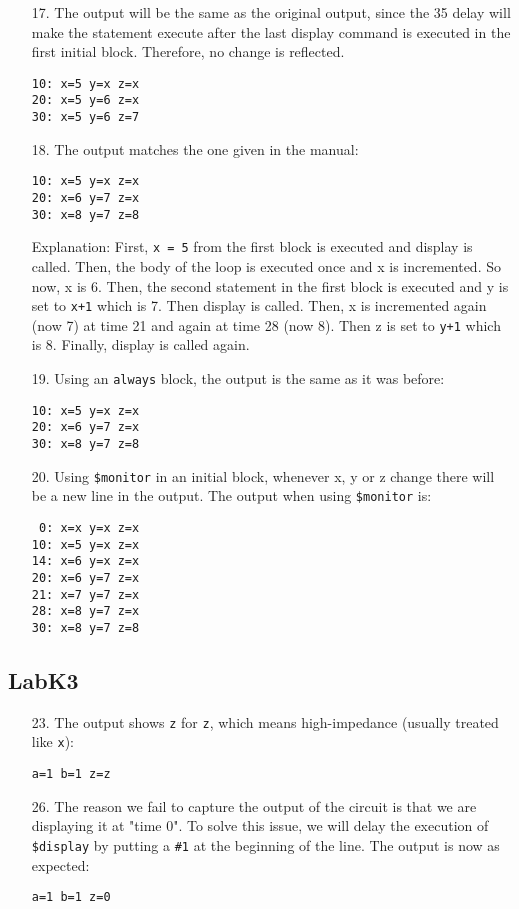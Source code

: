 \documentclass{article}
\begin{document}
\begin{enumerate}
\item[17. ] The output will be the same as the original output, since the 35 delay will make the statement execute after the last display command is executed in the first initial block. Therefore, no change is reflected.
    \begin{verbatim}
10: x=5 y=x z=x
20: x=5 y=6 z=x
30: x=5 y=6 z=7
    \end{verbatim}

\item[18. ] The output matches the one given in the manual:
    \begin{verbatim}
10: x=5 y=x z=x
20: x=6 y=7 z=x
30: x=8 y=7 z=8
    \end{verbatim}
    Explanation:
    First, \verb$x = 5$ from the first block is executed and display is called. Then, the body of the loop is executed once and x is incremented. So now, x is 6. Then, the second statement in the first block is executed and y is set to \verb$x+1$ which is 7. Then display is called. Then, x is incremented again (now 7) at time 21 and again at time 28 (now 8). Then z is set to \verb$y+1$ which is 8. Finally, display is called again.

\item[19. ] Using an \verb$always$ block, the output is the same as it was before:
    \begin{verbatim}
10: x=5 y=x z=x
20: x=6 y=7 z=x
30: x=8 y=7 z=8
    \end{verbatim}

\item[20. ] Using \verb#$monitor# in an initial block, whenever x, y or z change there will be a new line in the output. The output when using \verb#$monitor# is:
    \begin{verbatim}
 0: x=x y=x z=x
10: x=5 y=x z=x
14: x=6 y=x z=x
20: x=6 y=7 z=x
21: x=7 y=7 z=x
28: x=8 y=7 z=x
30: x=8 y=7 z=8
    \end{verbatim}

\end{enumerate}

\subsection{LabK3}
\begin{enumerate}
\item[23. ] The output shows \verb$z$ for \verb$z$, which means high-impedance (usually treated like \verb$x$):
\begin{verbatim}
a=1 b=1 z=z
\end{verbatim}

\item[26. ] The reason we fail to capture the output of the circuit is that we are displaying it at "time 0". To solve this issue, we will delay the execution of \verb#$display# by putting a \verb$#1$ at the beginning of the line. The output is now as expected:
\begin{verbatim}
a=1 b=1 z=0
\end{verbatim}
\end{enumerate}
\end{document}

